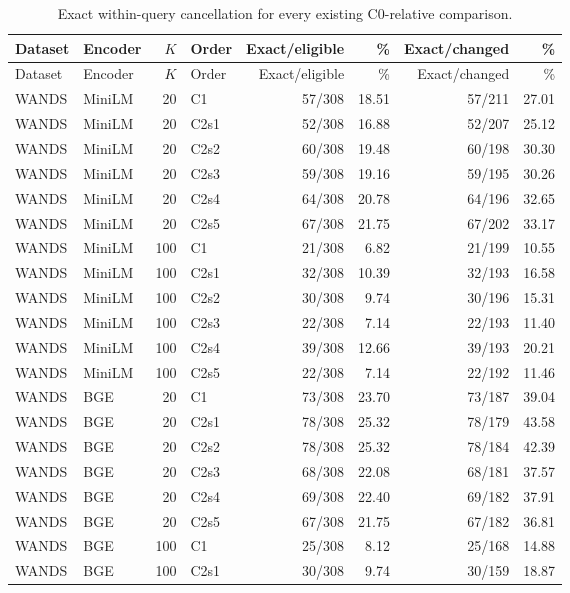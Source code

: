 \begin{longtable}{llrlrrrr}
\caption{Exact within-query cancellation for every existing C0-relative comparison.}\\
\toprule
Dataset & Encoder & $K$ & Order & Exact/eligible & \% & Exact/changed & \% \\
\midrule
\endfirsthead
\toprule Dataset & Encoder & $K$ & Order & Exact/eligible & \% & Exact/changed & \% \\ \midrule
\endhead
WANDS & MiniLM & 20 & C1 & 57/308 & 18.51 & 57/211 & 27.01 \\
WANDS & MiniLM & 20 & C2s1 & 52/308 & 16.88 & 52/207 & 25.12 \\
WANDS & MiniLM & 20 & C2s2 & 60/308 & 19.48 & 60/198 & 30.30 \\
WANDS & MiniLM & 20 & C2s3 & 59/308 & 19.16 & 59/195 & 30.26 \\
WANDS & MiniLM & 20 & C2s4 & 64/308 & 20.78 & 64/196 & 32.65 \\
WANDS & MiniLM & 20 & C2s5 & 67/308 & 21.75 & 67/202 & 33.17 \\
WANDS & MiniLM & 100 & C1 & 21/308 & 6.82 & 21/199 & 10.55 \\
WANDS & MiniLM & 100 & C2s1 & 32/308 & 10.39 & 32/193 & 16.58 \\
WANDS & MiniLM & 100 & C2s2 & 30/308 & 9.74 & 30/196 & 15.31 \\
WANDS & MiniLM & 100 & C2s3 & 22/308 & 7.14 & 22/193 & 11.40 \\
WANDS & MiniLM & 100 & C2s4 & 39/308 & 12.66 & 39/193 & 20.21 \\
WANDS & MiniLM & 100 & C2s5 & 22/308 & 7.14 & 22/192 & 11.46 \\
WANDS & BGE & 20 & C1 & 73/308 & 23.70 & 73/187 & 39.04 \\
WANDS & BGE & 20 & C2s1 & 78/308 & 25.32 & 78/179 & 43.58 \\
WANDS & BGE & 20 & C2s2 & 78/308 & 25.32 & 78/184 & 42.39 \\
WANDS & BGE & 20 & C2s3 & 68/308 & 22.08 & 68/181 & 37.57 \\
WANDS & BGE & 20 & C2s4 & 69/308 & 22.40 & 69/182 & 37.91 \\
WANDS & BGE & 20 & C2s5 & 67/308 & 21.75 & 67/182 & 36.81 \\
WANDS & BGE & 100 & C1 & 25/308 & 8.12 & 25/168 & 14.88 \\
WANDS & BGE & 100 & C2s1 & 30/308 & 9.74 & 30/159 & 18.87 \\

\end{longtable}
